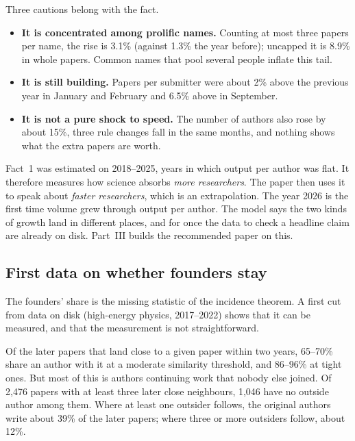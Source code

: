 Three cautions belong with the fact.

\begin{itemize}
\item \textbf{It is concentrated among prolific names.} Counting at most three papers per name, the rise is 3.1\% (against 1.3\% the year before); uncapped it is 8.9\% in whole papers. Common names that pool several people inflate this tail.
\item \textbf{It is still building.} Papers per submitter were about 2\% above the previous year in January and February and 6.5\% above in September.
\item \textbf{It is not a pure shock to speed.} The number of authors also rose by about 15\%, three rule changes fall in the same months, and nothing shows what the extra papers are worth.
\end{itemize}

\begin{ideabox}
Fact~1 was estimated on 2018--2025, years in which output per author was flat. It therefore measures how science absorbs \emph{more researchers}. The paper then uses it to speak about \emph{faster researchers}, which is an extrapolation. The year 2026 is the first time volume grew through output per author. The model says the two kinds of growth land in different places, and for once the data to check a headline claim are already on disk. Part~III builds the recommended paper on this.
\end{ideabox}

\subsection{First data on whether founders stay}

The founders' share is the missing statistic of the incidence theorem. A first cut from data on disk (high-energy physics, 2017--2022) shows that it can be measured, and that the measurement is not straightforward.

Of the later papers that land close to a given paper within two years, 65--70\% share an author with it at a moderate similarity threshold, and 86--96\% at tight ones. But most of this is authors continuing work that nobody else joined. Of 2,476 papers with at least three later close neighbours, 1,046 have no outside author among them. Where at least one outsider follows, the original authors write about 39\% of the later papers; where three or more outsiders follow, about 12\%.

